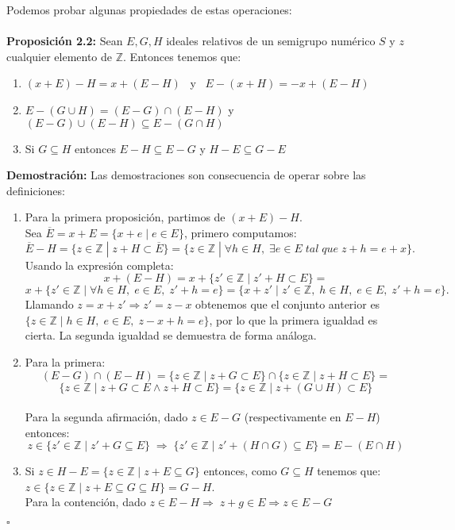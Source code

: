 \documentclass[11pt,spanish]{book}
\newcommand{\qed}{\begin{flushright} $\square$ \end{flushright}}
\begin{document}
Podemos probar algunas propiedades de estas operaciones:\\
\\ \textbf{Proposición 2.2: } Sean $E, G, H$ ideales relativos de un semigrupo numérico $S$ y $z$ cualquier elemento de $\mathbb{Z}$. Entonces tenemos que:
\begin{enumerate}
    \item $(x+E)-H=x+(E-H)$ \ y \ $E-(x+H)=-x+(E-H)$
    \item $E-(G\cup H) = (E-G)\cap(E-H)$ y $(E-G)\cup (E-H)\subseteq E-(G\cap H)$
    \item Si $G\subseteq H$ entonces $E-H\subseteq E-G$ y $H-E\subseteq G-E$
\end{enumerate}
\textbf{Demostración:}
Las demostraciones son consecuencia de operar sobre las definiciones:
\begin{enumerate}
    \item Para la primera proposición, partimos de $(x+E)-H$.\\
    Sea $\overline{E}=x+E=\{x+e\;|\; e\in E\}$, primero computamos:
    $$\overline{E}-H=\{z\in\mathbb{Z}\;|\; z+H\subset\overline{E}\}=\{z\in\mathbb{Z}\;|\;\forall h\in H,\;\exists e\in E \;tal\; que\; z+h=e+x\}.$$
    Usando la expresión completa: $$x+(E-H)=x+\{z'\in\mathbb{Z}\;|\;z'+H\subset E\}=$$
    $$x+\{z'\in\mathbb{Z}\;|\;\forall h\in H,\; e\in E,\; z'+h=e\}=\{x+z'\;|\; z'\in\mathbb{Z},\; h\in H,\; e\in E,\;z'+h=e\}.$$
    Llamando $z=x+z'\Rightarrow z'=z-x$ obtenemos que el conjunto anterior es $\{z\in\mathbb{Z}\;|\; h\in H,\; e\in E,\;z-x+h=e\}$, por lo que la primera igualdad es cierta. La segunda igualdad se demuestra de forma análoga.
    \item Para la primera: $$(E-G)\cap(E-H) = \{z\in\mathbb{Z}\;|\; z+G\subset E\}\cap \{z\in\mathbb{Z}\;|\; z+H\subset E\} =$$
    $$\{z\in\mathbb{Z}\;|\; z+G\subset E \land z+H\subset E\} = \{z\in\mathbb{Z}\;|\; z+(G\cup H)\subset E\}$$\\
    Para la segunda afirmación, dado $z\in E-G$ (respectivamente en $E-H$) entonces: $$z\in\{z'\in\mathbb{Z}\;|\; z'+G\subseteq E\}\;\Rightarrow\; \{z'\in\mathbb{Z}\;|\; z'+(H\cap G)\subseteq E\}=E-(E\cap H)$$
    \item Si $z\in H-E=\{z\in\mathbb{Z}\;|\; z+ E\subseteq G\}$ entonces, como $G\subseteq H$ tenemos que: $z\in\{z\in\mathbb{Z}\;|\; z+E\subseteq G\subseteq H\}=G-H$. \\
    Para la contención, dado $z\in E-H\Rightarrow\; z+g\in E\Rightarrow z\in E-G$
\end{enumerate}
\qed
\end{document}
